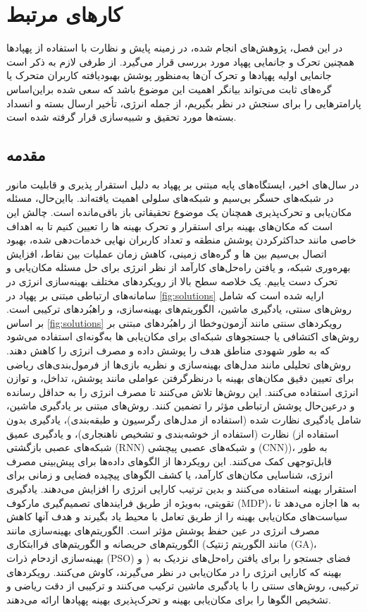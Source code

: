 \chapter{کارهای مرتبط}\label{Chapter2-2}
در این فصل، پژوهش‌های انجام شده، در زمینه پایش و نظارت با استفاده از پهپادها همچنین تحرک و جانمایی پهپاد مورد بررسی قرار می‌گیرد. از طرفی لازم به ذکر است جانمایی اولیه پهپادها و تحرک آن‌ها به‌منظور پوشش بهبودیافته کاربران متحرک یا گره‌های ثابت می‌تواند بیانگر اهمیت این موضوع باشد که سعی شده براین‌اساس پارامترهایی را برای سنجش در نظر بگیریم، از جمله انرژی، تأخیر ارسال بسته و انسداد بسته‌ها مورد تحقیق و شبیه‌سازی قرار گرفته شده است.
\section{مقدمه}
در سال‌های اخیر، ایستگاه‌های پایه مبتنی بر پهپاد به دلیل استقرار پذیری و قابلیت مانور در شبکه‌های حسگر بی‌سیم و شبکه‌های سلولی اهمیت یافته‌اند. بااین‌حال، مسئله مکان‌یابی و تحرک‌پذیری همچنان یک موضوع تحقیقاتی باز باقی‌مانده است. چالش این است که مکان‌های بهینه برای استقرار و تحرک بهینه ها را تعیین کنیم تا به اهداف خاصی مانند حداکثرکردن پوشش منطقه و تعداد کاربران نهایی خدمات‌دهی شده، بهبود اتصال بی‌سیم بین ها و گره‌های زمینی، کاهش زمان عملیات بین نقاط، افزایش بهره‌وری شبکه، و یافتن راه‌حل‌های کارآمد از نظر انرژی برای حل مسئله مکان‌یابی و تحرک  دست یابیم.
یک خلاصه سطح بالا از رویکردهای مختلف بهینه‌سازی انرژی در سامانه‌های ارتباطی مبتنی بر پهپاد در \autoref{fig:solutions} ارایه شده است که شامل روش‌های سنتی، یادگیری ماشین، الگوریتم‌های بهینه‌سازی، و راهبُردهای ترکیبی است.
بر اساس \autoref{fig:solutions} رویکردهای سنتی مانند آزمون‌وخطا از راهبُردهای مبتنی بر روش‌های اکتشافی یا جستجوهای شبکه‌ای برای مکان‌یابی ها به‌گونه‌ای استفاده می‌شود که به طور شهودی مناطق هدف را پوشش داده و مصرف انرژی را کاهش دهند. روش‌های تحلیلی مانند مدل‌های بهینه‌سازی و نظریه بازی‌ها از فرمول‌بندی‌های ریاضی برای تعیین دقیق مکان‌های بهینه  با درنظرگرفتن عواملی مانند پوشش، تداخل، و توازن انرژی استفاده می‌کنند. این روش‌ها تلاش می‌کنند تا مصرف انرژی را به حداقل رسانده و درعین‌حال پوشش ارتباطی مؤثر را تضمین کنند.
روش‌های مبتنی بر یادگیری ماشین، شامل یادگیری نظارت شده (استفاده از مدل‌های رگرسیون و طبقه‌بندی)، یادگیری بدون نظارت (استفاده از خوشه‌بندی و تشخیص ناهنجاری)، و یادگیری عمیق (استفاده از شبکه‌های عصبی بازگشتی (\gls{RNN}) و شبکه‌های عصبی پیچشی (\gls{CNN}))، به طور قابل‌توجهی کمک می‌کنند. این رویکردها از الگوهای داده‌ها برای پیش‌بینی مصرف انرژی، شناسایی مکان‌های کارآمد، یا کشف الگوهای پیچیده فضایی و زمانی برای استقرار بهینه  استفاده می‌کنند و بدین ترتیب کارایی انرژی را افزایش می‌دهند. یادگیری تقویتی، به‌ویژه از طریق فرایندهای تصمیم‌گیری مارکوف (\gls{MDP})، به ها اجازه می‌دهد تا سیاست‌های مکان‌یابی بهینه را از طریق تعامل با محیط یاد بگیرند و هدف آنها کاهش مصرف انرژی در عین حفظ پوشش مؤثر است. الگوریتم‌های بهینه‌سازی مانند الگوریتم‌های حریصانه و الگوریتم‌های فراابتکاری (مانند الگوریتم ژنتیک (\gls{GA})، بهینه‌سازی ازدحام ذرات (\gls{PSO}) و ) فضای جستجو را برای یافتن راه‌حل‌های نزدیک به بهینه که کارایی انرژی را در مکان‌یابی  در نظر می‌گیرند، کاوش می‌کنند. رویکردهای ترکیبی، روش‌های سنتی را با یادگیری ماشین ترکیب می‌کنند و ترکیبی از دقت ریاضی و تشخیص الگوها را برای مکان‌یابی بهینه و تحرک‌پذیری بهینه پهپادها ارائه می‌دهند.
